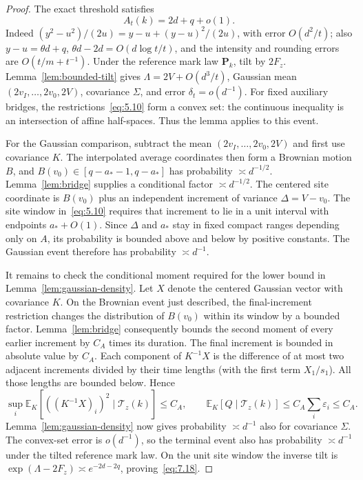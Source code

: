 \documentclass[11pt,a4paper]{article}
\numberwithin{equation}{section}
\theoremstyle{remark}
\begin{document}
\begin{proof}
The exact threshold satisfies
\begin{equation}\label{eq:7.19}
A_t(k)=2d+q+o(1).
\end{equation}
Indeed $(y^2-u^2)/(2u)=y-u+(y-u)^2/(2u)$, with error $O(d^2/t)$; also
$y-u=\theta d+q$, $\theta d-2d=O(d\log t/t)$, and the intensity and rounding errors are $O(t/m+t^{-1})$.
Under the reference mark law $\mathbf P_k$, tilt by $2F_z$. Lemma~\ref{lem:bounded-tilt} gives
$\Lambda=2V+O(d^3/t)$, Gaussian mean
$(2v_I,\ldots,2v_0,2V)$, covariance $\Sigma$, and error $\delta_t=o(d^{-1})$.
For fixed auxiliary bridges, the restrictions~\eqref{eq:5.10} form a convex set: the continuous inequality is an intersection of affine half-spaces. Thus the lemma applies to this event.

For the Gaussian comparison, subtract the mean $(2v_I,\ldots,2v_0,2V)$ and first use covariance $K$. The interpolated average coordinates then form a Brownian motion $B$, and
$B(v_0)\in[q-a_*-1,q-a_*]$ has probability $\asymp d^{-1/2}$.
Lemma~\ref{lem:bridge} supplies a conditional factor $\asymp d^{-1/2}$.
The centered site coordinate is $B(v_0)$ plus an independent increment of variance
$\Delta=V-v_0$. The site window in~\eqref{eq:5.10} requires that increment to lie in a unit interval with endpoints $a_*+O(1)$. Since $\Delta$ and $a_*$ stay in fixed compact ranges depending only on $A$, its probability is bounded above and below by positive constants. The Gaussian event therefore has probability $\asymp d^{-1}$.

It remains to check the conditional moment required for the lower bound in Lemma~\ref{lem:gaussian-density}. Let $X$ denote the centered Gaussian vector with covariance $K$. On the Brownian event just described, the final-increment restriction changes the distribution of $B(v_0)$ within its window by a bounded factor. Lemma~\ref{lem:bridge} consequently bounds the second moment of every earlier increment by $C_A$ times its duration. The final increment is bounded in absolute value by $C_A$.
Each component of $K^{-1}X$ is the difference of at most two adjacent increments divided by their time lengths (with the first term $X_1/s_1$). All those lengths are bounded below. Hence
\[
\sup_i\mathbb E_K[((K^{-1}X)_i)^2\mid\mathcal T_z(k)]\le C_A,
\qquad \mathbb E_K[Q\mid\mathcal T_z(k)]\le C_A\sum_i\varepsilon_i\le C_A.
\]
Lemma~\ref{lem:gaussian-density} now gives probability $\asymp d^{-1}$ also for covariance $\Sigma$.
The convex-set error is $o(d^{-1})$, so the terminal event also has probability $\asymp d^{-1}$ under the tilted reference mark law. On the unit site window the inverse tilt is
$\exp(\Lambda-2F_z)\asymp e^{-2d-2q}$, proving~\eqref{eq:7.18}.
\end{proof}
\end{document}
